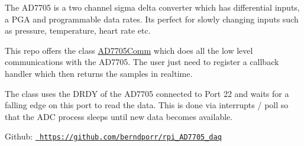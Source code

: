 The A\+D7705 is a two channel sigma delta converter which has differential inputs, a P\+GA and programmable data rates. It\textquotesingle{}s perfect for slowly changing inputs such as pressure, temperature, heart rate etc.

This repo offers the class {\ttfamily \mbox{\hyperlink{classAD7705Comm}{A\+D7705\+Comm}}} which does all the low level communications with the A\+D7705. The user just need to register a callback handler which then returns the samples in realtime.

The class uses the D\+R\+DY of the A\+D7705 connected to Port 22 and waits for a falling edge on this port to read the data. This is done via interrupts / poll so that the A\+DC process sleeps until new data becomes available.

Github\+: \href{https://github.com/berndporr/rpi_AD7705_daq}{\texttt{ https\+://github.\+com/berndporr/rpi\+\_\+\+A\+D7705\+\_\+daq}} 
